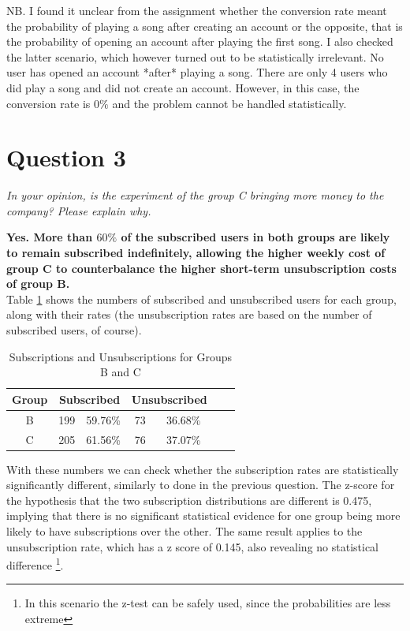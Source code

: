 \documentclass[paper=a4, fontsize=10pt]{report}
\begin{document}
\vspace{1cm}
NB. I found it unclear from the assignment whether the conversion rate meant the probability of
playing a song after creating an account or the opposite, that is the probability of opening an account after
playing the first song. I also checked the latter scenario, which however turned out to be statistically irrelevant.
No user has opened an account *after* playing a song. There are only 4 users who did play a song and did not create an account.
However, in this case, the conversion rate is $0\%$ and the problem cannot be handled statistically.

\section*{Question 3}

\textit{In your opinion, is the experiment of the group C bringing more money to the company? Please explain why.}

\textbf{Yes. More than $60\%$ of the subscribed users in both groups are likely to remain subscribed indefinitely, allowing
the higher weekly cost of group C to counterbalance the higher short-term unsubscription costs of group B.}\\



Table \ref{tab:sub_unsub_rates} shows the numbers of subscribed and unsubscribed users for each group, along with their rates (the unsubscription rates are based on the number of subscribed users, of course).

\begin{table}[htbp]
\normalsize

  \centering
  \caption{Subscriptions and Unsubscriptions for Groups B and C}
    \begin{tabular}{ccccccc}
    \toprule
    \textbf{Group } & \multicolumn{2}{c}{\textbf{Subscribed}} & \multicolumn{2}{c}{\textbf{Unsubscribed}} \\
    \midrule
    B & 199  & 59.76\% & 73  & 36.68\%  \\
    C & 205   & 61.56\% & 76   & 37.07\%  \\
    \bottomrule
    \end{tabular}%
  \label{tab:sub_unsub_rates}%
\end{table}%
\normalsize

With these numbers we can check whether the subscription rates are statistically significantly different, similarly
to done in the previous question. The z-score for the hypothesis that the two subscription distributions are different is 0.475, implying that there is no significant statistical evidence for one group being more likely to have
subscriptions over the other. The same result applies to the unsubscription rate, which has a z score of 0.145, also revealing no statistical difference
\footnote{In this scenario the z-test can be safely used, since the probabilities are less extreme}.
\end{document}
